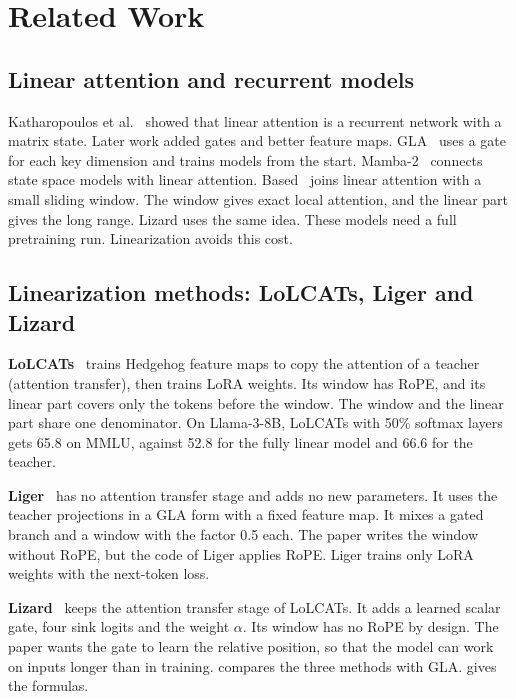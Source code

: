 \chapter{Related Work}
\label{ch:related}

\section{Linear attention and recurrent models}
\label{sec:rw-linear}

Katharopoulos et al.~\cite{katharopoulos2020} showed that linear attention is a recurrent network with a matrix state. Later work added gates and better feature maps. GLA~\cite{gla} uses a gate for each key dimension and trains models from the start. Mamba-2~\cite{mamba2} connects state space models with linear attention. Based~\cite{based} joins linear attention with a small sliding window. The window gives exact local attention, and the linear part gives the long range. Lizard uses the same idea. These models need a full pretraining run. Linearization avoids this cost.

\section{Linearization methods: LoLCATs, Liger and Lizard}
\label{sec:rw-linearization}

\textbf{LoLCATs}~\cite{lolcats} trains Hedgehog feature maps to copy the attention of a teacher (attention transfer), then trains LoRA weights. Its window has RoPE, and its linear part covers only the tokens before the window. The window and the linear part share one denominator. On Llama-3-8B, LoLCATs with 50\% softmax layers gets 65.8 on MMLU, against 52.8 for the fully linear model and 66.6 for the teacher.

\textbf{Liger}~\cite{liger} has no attention transfer stage and adds no new parameters. It uses the teacher projections in a GLA form with a fixed feature map. It mixes a gated branch and a window with the factor 0.5 each. The paper writes the window without RoPE, but the code of Liger applies RoPE. Liger trains only LoRA weights with the next-token loss.

\textbf{Lizard}~\cite{lizard} keeps the attention transfer stage of LoLCATs. It adds a learned scalar gate, four sink logits and the weight $\alpha$. Its window has no RoPE by design. The paper wants the gate to learn the relative position, so that the model can work on inputs longer than in training.  compares the three methods with GLA.  gives the formulas.

